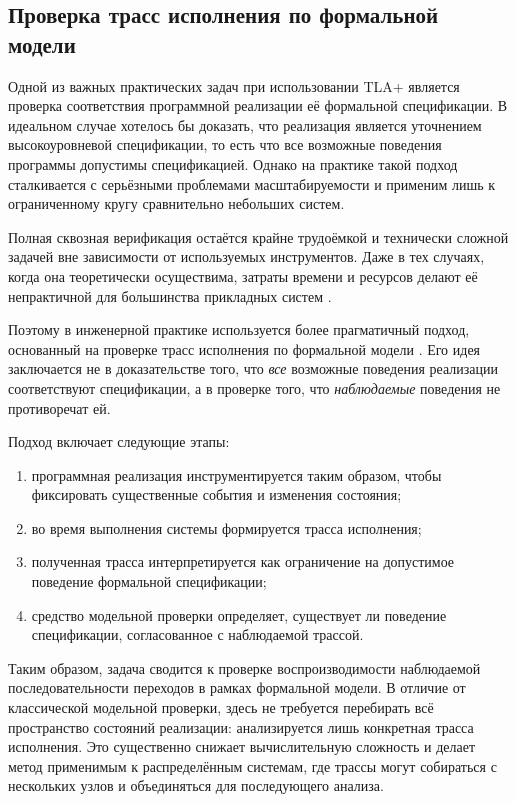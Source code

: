 \subsection{Проверка трасс исполнения по формальной модели}

Одной из важных практических задач при использовании TLA+ является
проверка соответствия программной реализации её формальной
спецификации. В идеальном случае хотелось бы доказать, что реализация
является уточнением высокоуровневой спецификации, то есть что все
возможные поведения программы допустимы спецификацией. Однако на
практике такой подход сталкивается с серьёзными проблемами
масштабируемости и применим лишь к ограниченному кругу сравнительно
небольших систем.

Полная сквозная верификация остаётся крайне трудоёмкой и технически
сложной задачей вне зависимости от используемых инструментов. Даже в
тех случаях, когда она теоретически осуществима, затраты времени и
ресурсов делают её непрактичной для большинства прикладных систем
\cite{cirstea2024validating}.

Поэтому в инженерной практике используется более прагматичный подход,
основанный на проверке трасс исполнения по формальной модели
\cite{howard2011tracechecking}. Его идея заключается не в
доказательстве того, что \emph{все} возможные поведения реализации
соответствуют спецификации, а в проверке того, что \emph{наблюдаемые}
поведения не противоречат ей.

Подход включает следующие этапы:

\begin{enumerate}
    \item программная реализация инструментируется таким образом, чтобы
    фиксировать существенные события и изменения состояния;
    \item во время выполнения системы формируется трасса исполнения;
    \item полученная трасса интерпретируется как ограничение на
    допустимое поведение формальной спецификации;
    \item средство модельной проверки определяет, существует ли
    поведение спецификации, согласованное с наблюдаемой трассой.
\end{enumerate}

Таким образом, задача сводится к проверке воспроизводимости
наблюдаемой последовательности переходов в рамках формальной модели.
В отличие от классической модельной проверки, здесь не требуется
перебирать всё пространство состояний реализации: анализируется лишь
конкретная трасса исполнения. Это существенно снижает вычислительную
сложность и делает метод применимым к распределённым системам, где
трассы могут собираться с нескольких узлов и объединяться для
последующего анализа.

